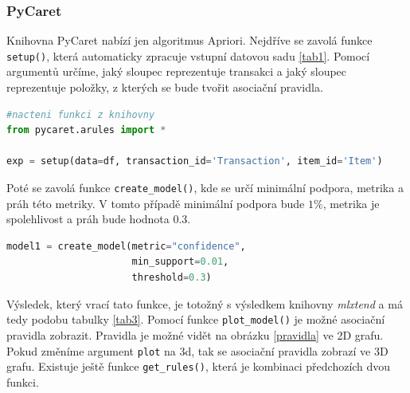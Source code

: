 \subsubsection*{PyCaret}
Knihovna PyCaret nabízí jen algoritmus Apriori. Nejdříve se zavolá funkce \verb|setup()|, která automaticky zpracuje vstupní datovou sadu \ref{tab1}. Pomocí argumentů určíme, jaký sloupec reprezentuje transakci a jaký sloupec reprezentuje položky, z kterých se bude tvořit asociační pravidla.

\begin{mdframed}
\begin{lstlisting}[language=Python]
#nacteni funkci z knihovny
from pycaret.arules import *

exp = setup(data=df, transaction_id='Transaction', item_id='Item')
\end{lstlisting}   
\end{mdframed}

Poté se zavolá funkce \verb|create_model()|, kde se určí minimální podpora, metrika a práh této metriky. V tomto případě minimální podpora bude $1\%$, metrika je spolehlivost a práh bude hodnota 0.3.

\begin{mdframed}
\begin{lstlisting}[language=Python]
model1 = create_model(metric="confidence", 
                      min_support=0.01, 
                      threshold=0.3)
\end{lstlisting}   
\end{mdframed}

Výsledek, který vrací tato funkce, je totožný s výsledkem knihovny \textit{mlxtend} a má tedy podobu tabulky \ref{tab3}. Pomocí funkce \verb|plot_model()| je možné asociační pravidla zobrazit. Pravidla je možné vidět na obrázku \ref{pravidla} ve 2D grafu. Pokud změníme argument \verb|plot| na 3d, tak se asociační pravidla zobrazí ve 3D grafu. Existuje ještě funkce \verb|get_rules()|, která je kombinaci předchozích dvou funkci.

